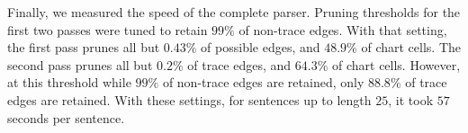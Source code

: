 Finally, we measured the speed of the complete parser.
Pruning thresholds for the first two passes were tuned to retain $99\%$ of non-trace edges.
With that setting, the first pass prunes all but $0.43\%$ of possible edges, and $48.9\%$ of chart cells.
The second pass prunes all but $0.2\%$ of trace edges, and $64.3\%$ of chart cells.
However, at this threshold while $99\%$ of non-trace edges are retained, only $88.8\%$ of trace edges are retained.
With these settings, for sentences up to length $25$, it took $57$ seconds per sentence.

